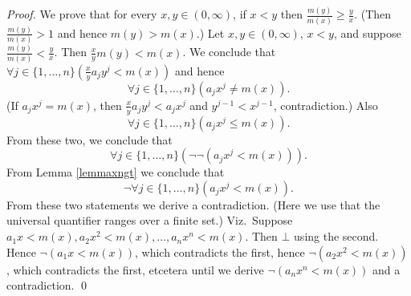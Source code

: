 \begin{proof}
We prove that for every $x,y\in(0,\infty)$, if $x<y$ then $\frac{m(y)}{m(x)}
\geq \frac{y}{x}$. (Then $\frac{m(y)}{m(x)} >1$ and hence $m(y)>m(x)$.)
Let $x,y\in(0,\infty)$, $x<y$, and suppose $\frac{m(y)}{m(x)}
< \frac{y}{x}$. Then $\frac{x}{y}m(y) < m(x)$. We conclude that
$\forall j\in\{1,\ldots,n\} (\frac{x}{y} a_j y^j < m(x))$ and hence
$$\forall j\in\{1,\ldots,n\} ( a_j x^j \neq m(x)).$$ 
(If $a_j x^j =
m(x)$, then $\frac{x}{y} a_j y^j < a_j x^j$ and $y^{j-1}< x^{j-1}$,
contradiction.) Also 
$$\forall j\in\{1,\ldots,n\} ( a_j x^j \leq  m(x)).$$ 
From these two, we conclude that
$$\forall j\in\{1,\ldots,n\} ( \neg\neg (a_j x^j <  m(x))).$$
From Lemma \ref{lemmaxngt} we conclude that
$$\neg \forall j\in\{1,\ldots,n\} (a_j x^j < m(x)).$$ From these two
statements we derive a contradiction. (Here we use that the universal
quantifier ranges over a finite set.) Viz.\ Suppose $a_1 x <  m(x),
a_2 x^2 <  m(x),\ldots, a_n x^n <  m(x)$. Then $\bot$ using the
second. Hence $\neg(a_1 x <  m(x))$, which contradicts the first,
hence $\neg(a_2 x^2 <  m(x))$, which contradicts the first, etcetera
until we derive $\neg(a_n x^n <  m(x))$ and a contradiction.
\qed
\end{proof}
